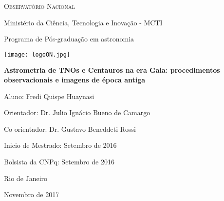 \thispagestyle{empty}
{\large

{\scshape Observat\'orio Nacional

Minist\'erio da Ci\^encia, Tecnologia e Inova\c{c}\~ao - MCTI

Programa de P\'os-gradua\c{c}\~ao em astronomia}

\vspace{1cm}

\begin{center}
\texttt{[image: logoON.jpg]} 
\end{center}

\vspace{1cm}

\begin{center}
\bfseries\Large Astrometria de TNOs e Centauros na era Gaia: procedimentos observacionais e imagens de época antiga
\end{center}

\vspace{1cm}

{\scshape
\begin{center}
Aluno: Fredi Quispe Huaynasi	

Orientador: Dr. Julio Ign\'acio Bueno de Camargo

Co-orientador: Dr. Gustavo Beneddeti Rossi
\end{center}

\vspace{1cm}

\begin{center}
Inicio de Mestrado: Setembro de 2016 

Bolsista da CNPq: Setembro de 2016
\end{center}}

\vfill

\begin{center}
Rio de Janeiro

Novembro de 2017 
\end{center}



}

\newpage
